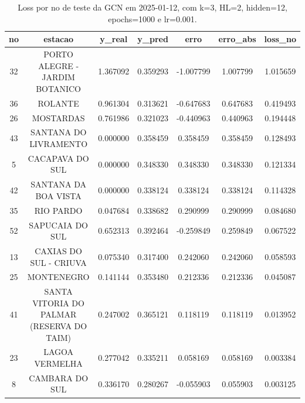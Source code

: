 \begin{table}[h]
\centering
\caption{Loss por no de teste da GCN em 2025-01-12, com k=3, HL=2, hidden=12, epochs=1000 e lr=0.001.}
\label{tab:gcn_loss_k3_hl2_h12_e1000_d20250112}
\begin{tabular}{ccccccc}
\toprule
no & estacao & y\_real & y\_pred & erro & erro\_abs & loss\_no \\
\midrule
32 & PORTO ALEGRE - JARDIM BOTANICO & 1.367092 & 0.359293 & -1.007799 & 1.007799 & 1.015659 \\
36 & ROLANTE & 0.961304 & 0.313621 & -0.647683 & 0.647683 & 0.419493 \\
26 & MOSTARDAS & 0.761986 & 0.321023 & -0.440963 & 0.440963 & 0.194448 \\
43 & SANTANA DO LIVRAMENTO & 0.000000 & 0.358459 & 0.358459 & 0.358459 & 0.128493 \\
5 & CACAPAVA DO SUL & 0.000000 & 0.348330 & 0.348330 & 0.348330 & 0.121334 \\
42 & SANTANA DA BOA VISTA & 0.000000 & 0.338124 & 0.338124 & 0.338124 & 0.114328 \\
35 & RIO PARDO & 0.047684 & 0.338682 & 0.290999 & 0.290999 & 0.084680 \\
52 & SAPUCAIA DO SUL & 0.652313 & 0.392464 & -0.259849 & 0.259849 & 0.067522 \\
13 & CAXIAS DO SUL - CRIUVA & 0.075340 & 0.317400 & 0.242060 & 0.242060 & 0.058593 \\
25 & MONTENEGRO & 0.141144 & 0.353480 & 0.212336 & 0.212336 & 0.045087 \\
41 & SANTA VITORIA DO PALMAR (RESERVA DO TAIM) & 0.247002 & 0.365121 & 0.118119 & 0.118119 & 0.013952 \\
23 & LAGOA VERMELHA & 0.277042 & 0.335211 & 0.058169 & 0.058169 & 0.003384 \\
8 & CAMBARA DO SUL & 0.336170 & 0.280267 & -0.055903 & 0.055903 & 0.003125 \\
\bottomrule
\end{tabular}
\end{table}
